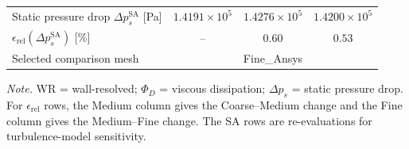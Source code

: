 \begin{table}[htbp]
\begin{tabular*}{\textwidth}{@{\extracolsep{\fill}}lccc@{}}
		Static pressure drop $\Delta p_s^{\mathrm{SA}}$ [Pa] & $1.4191 \times 10^{5}$ & $1.4276 \times 10^{5}$ & $1.4200 \times 10^{5}$ \\
		$\epsilon_{\mathrm{rel}}(\Delta p_s^{\mathrm{SA}})$ [\%] & -- & $0.60$ & $0.53$ \\
		Selected comparison mesh & \multicolumn{3}{c}{Fine\_Ansys} \\
		\hline
	\end{tabular*}
	\vspace{2pt}
	\begin{minipage}{0.98\textwidth}
		\scriptsize \textit{Note.} WR = wall-resolved; $\Phi_D$ = viscous dissipation; $\Delta p_s$ = static pressure drop. For $\epsilon_{\mathrm{rel}}$ rows, the Medium column gives the Coarse--Medium change and the Fine column gives the Medium--Fine change. The SA rows are re-evaluations for turbulence-model sensitivity.
	\end{minipage}
\end{table}

\FloatBarrier
